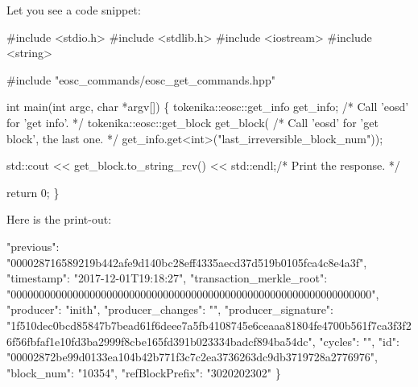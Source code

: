 Let you see a code snippet\+: 
\begin{DoxyCode}
#include <stdio.h>
#include <stdlib.h>
#include <iostream>
#include <string>

#include "eosc\_commands/eosc\_get\_commands.hpp"

int main(int argc, char *argv[])
\{
  tokenika::eosc::get\_info get\_info; /* Call 'eosd' for 'get info'. */
  tokenika::eosc::get\_block get\_block( /* Call 'eosd' for 'get block', the last one. */
    get\_info.get<int>("last\_irreversible\_block\_num"));

  std::cout << get\_block.to\_string\_rcv() << std::endl;/* Print the response. */

  return 0;
\}
\end{DoxyCode}
 Here is the print-\/out\+: 
\begin{DoxyCode}
    "previous": "000028716589219b442afe9d140bc28eff4335aecd37d519b0105fca4c8e4a3f",
    "timestamp": "2017-12-01T19:18:27",
    "transaction\_merkle\_root": "0000000000000000000000000000000000000000000000000000000000000000",
    "producer": "inith",
    "producer\_changes": "",
    "producer\_signature":
       "1f510dec0bcd85847b7bead61f6deee7a5fb4108745e6ceaaa81804fe4700b561f7ca3f3f26f56fbfaf1e10fd3ba2999f8cbe165fd391b023334badcf894ba54dc",
    "cycles": "",
    "id": "00002872be99d0133ea104b42b771f3c7c2ea3736263dc9db3719728a2776976",
    "block\_num": "10354",
    "refBlockPrefix": "3020202302"
\}
\end{DoxyCode}
 